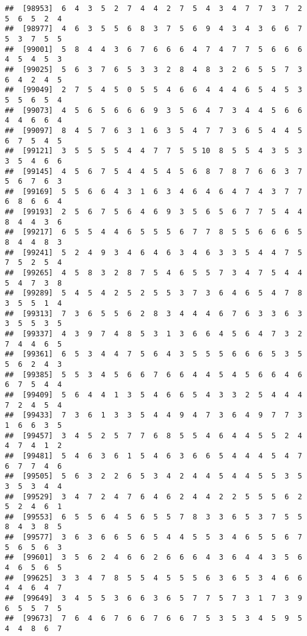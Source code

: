\documentclass[
]{book}
\begin{document}
\begin{verbatim}
##  [98953]  6  4  3  5  2  7  4  4  2  7  5  4  3  4  7  7  3  7  2  5  6  5  2  4
##  [98977]  4  6  3  5  5  6  8  3  7  5  6  9  4  3  4  3  6  6  7  5  3  7  5  5
##  [99001]  5  8  4  4  3  6  7  6  6  6  4  7  4  7  7  5  6  6  6  4  5  4  5  3
##  [99025]  5  6  3  7  6  5  3  3  2  8  4  8  3  2  6  5  5  7  3  6  4  2  4  5
##  [99049]  2  7  5  4  5  0  5  5  4  6  6  4  4  4  6  5  4  5  3  5  5  6  5  4
##  [99073]  4  5  6  5  6  6  6  9  3  5  6  4  7  3  4  4  5  6  6  4  4  6  6  4
##  [99097]  8  4  5  7  6  3  1  6  3  5  4  7  7  3  6  5  4  4  5  6  7  5  4  5
##  [99121]  3  5  5  5  5  4  4  7  7  5  5 10  8  5  5  4  3  5  3  3  5  4  6  6
##  [99145]  4  5  6  7  5  4  4  5  4  5  6  8  7  8  7  6  6  3  7  5  6  7  6  3
##  [99169]  5  5  6  6  4  3  1  6  3  4  6  4  6  4  7  4  3  7  7  6  8  6  6  4
##  [99193]  2  5  6  7  5  6  4  6  9  3  5  6  5  6  7  7  5  4  4  8  4  4  3  6
##  [99217]  6  5  5  4  4  6  5  5  5  6  7  7  8  5  5  6  6  6  5  8  4  4  8  3
##  [99241]  5  2  4  9  3  4  6  4  6  3  4  6  3  3  5  4  4  7  5  7  5  2  5  4
##  [99265]  4  5  8  3  2  8  7  5  4  6  5  5  7  3  4  7  5  4  4  5  4  7  3  8
##  [99289]  5  4  5  4  2  5  2  5  5  3  7  3  6  4  6  5  4  7  8  3  5  5  1  4
##  [99313]  7  3  6  5  5  6  2  8  3  4  4  4  6  7  6  3  3  6  3  3  5  5  3  5
##  [99337]  4  3  9  7  4  8  5  3  1  3  6  6  4  5  6  4  7  3  2  7  4  4  6  5
##  [99361]  6  5  3  4  4  7  5  6  4  3  5  5  5  6  6  6  5  3  5  5  6  2  4  3
##  [99385]  5  5  3  4  5  6  6  7  6  6  4  4  5  4  5  6  6  4  6  6  7  5  4  4
##  [99409]  5  6  4  4  1  3  5  4  6  6  5  4  3  3  2  5  4  4  4  7  2  4  5  4
##  [99433]  7  3  6  1  3  3  5  4  4  9  4  7  3  6  4  9  7  7  3  1  6  6  3  5
##  [99457]  3  4  5  2  5  7  7  6  8  5  5  4  6  4  4  5  5  2  4  4  7  4  1  2
##  [99481]  5  4  6  3  6  1  5  4  6  3  6  6  5  4  4  4  5  4  7  6  7  7  4  6
##  [99505]  5  6  3  2  2  6  5  3  4  2  4  4  5  4  4  5  5  3  5  3  5  3  4  4
##  [99529]  3  4  7  2  4  7  6  4  6  2  4  4  2  2  5  5  5  6  2  5  2  4  6  1
##  [99553]  6  5  5  6  4  5  6  5  5  7  8  3  3  6  5  3  7  5  5  8  4  3  8  5
##  [99577]  3  6  3  6  6  5  6  5  4  4  5  5  3  4  6  5  5  6  7  5  6  5  6  3
##  [99601]  3  5  6  2  4  6  6  2  6  6  6  4  3  6  4  4  3  5  6  4  6  5  6  5
##  [99625]  3  3  4  7  8  5  5  4  5  5  5  6  3  6  5  3  4  6  6  4  4  6  4  7
##  [99649]  3  4  5  5  3  6  6  3  6  5  7  7  5  7  3  1  7  3  9  6  5  5  7  5
##  [99673]  7  6  4  6  7  6  6  7  6  6  7  5  3  5  3  4  5  9  5  4  4  8  6  7

\end{verbatim}
\end{document}
